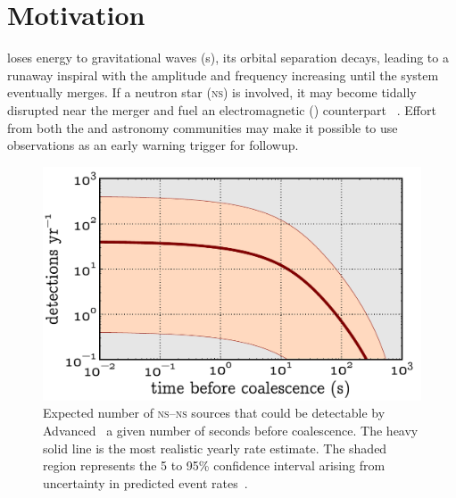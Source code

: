 \documentclass[portrait,plainboxedsections]{sciposter}
\begin{document}
\begin{minipage}[t]{0.25\textwidth}

\section*{Motivation}
 loses energy to gravitational waves (\GW{}s), its
orbital separation decays, leading to a runaway inspiral with the \GW{}
amplitude and frequency increasing until the system eventually merges.  If a
neutron star (\textsc{ns}) is involved, it may become tidally disrupted near
the merger and fuel an electromagnetic (\EM{}) counterpart~%
\citep{shibata:2007}.  Effort from both the \GW{} and astronomy communities may make it
possible to use \GW{} observations as an early warning trigger for \EM{}
followup.
%
\begin{figure}[h]
\includegraphics[width=1.05\textwidth]{figures/snr_in_time}
\caption{\label{fig:earlywarning}Expected number of \textsc{ns}--\textsc{ns}
sources that could be detectable by Advanced \LIGO\ a given number of seconds
before coalescence.  The heavy solid line is the most realistic yearly rate
estimate.  The shaded region represents the 5 to 95\% confidence interval
arising from uncertainty in predicted event rates~\citep{Abadie:2010p10836}.}
\end{figure}


\end{minipage}
\end{document}
